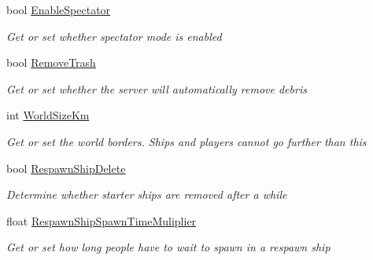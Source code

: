 \begin{DoxyCompactItemize}
\item 
bool \hyperlink{class_s_e_mod_a_p_i_1_1_a_p_i_1_1_definitions_1_1_dedicated_config_definition_a366f63f94887962c7ca95fbce5e68593}{Enable\+Spectator}
\begin{DoxyCompactList}\small\item\em Get or set whether spectator mode is enabled \end{DoxyCompactList}\item 
bool \hyperlink{class_s_e_mod_a_p_i_1_1_a_p_i_1_1_definitions_1_1_dedicated_config_definition_a3015e02cd21ec214c9549af6b1919a67}{Remove\+Trash}
\begin{DoxyCompactList}\small\item\em Get or set whether the server will automatically remove debris \end{DoxyCompactList}\item 
int \hyperlink{class_s_e_mod_a_p_i_1_1_a_p_i_1_1_definitions_1_1_dedicated_config_definition_af2750685c29481bb6be3f83baebf4fc7}{World\+Size\+Km}
\begin{DoxyCompactList}\small\item\em Get or set the world borders. Ships and players cannot go further than this \end{DoxyCompactList}\item 
bool \hyperlink{class_s_e_mod_a_p_i_1_1_a_p_i_1_1_definitions_1_1_dedicated_config_definition_a6c01f2b8e9a8aeddba6e7a5af58855a7}{Respawn\+Ship\+Delete}
\begin{DoxyCompactList}\small\item\em Determine whether starter ships are removed after a while \end{DoxyCompactList}\item 
float \hyperlink{class_s_e_mod_a_p_i_1_1_a_p_i_1_1_definitions_1_1_dedicated_config_definition_aa4b51daad9124f0dc2fd5a8e33caf720}{Respawn\+Ship\+Spawn\+Time\+Muliplier}
\begin{DoxyCompactList}\small\item\em Get or set how long people have to wait to spawn in a respawn ship \end{DoxyCompactList}\item 

\end{DoxyCompactItemize}

